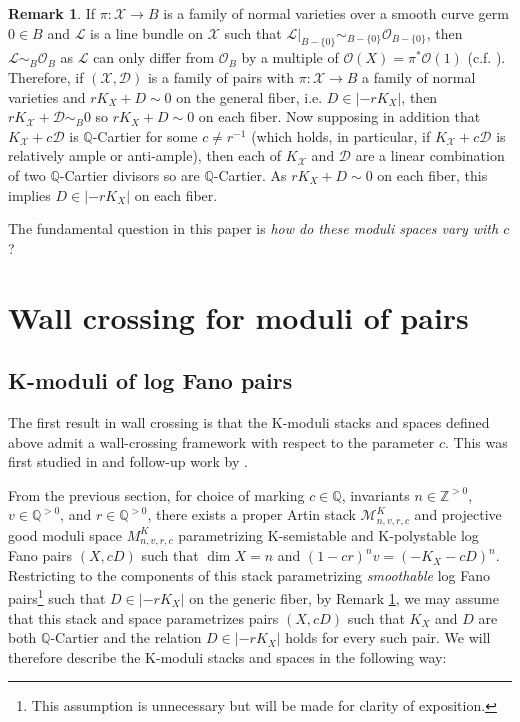 \documentclass[11pt]{amsart}
\numberwithin{equation}{section}
\theoremstyle{definition}
\newtheorem{remark}[theorem]{Remark}
\newcommand{\bQ}{\mathbb{Q}}
\newcommand{\calL}{\mathcal{L}}
\newcommand{\calX}{\mathcal{X}}
\newcommand{\calD}{\mathcal{D}}
\newcommand{\calO}{\mathcal{O}}
\newcommand{\calM}{\mathcal{M}}
\newcommand{\bZ}{\mathbb{Z}}
\begin{document}
\begin{remark}\label{rmk:fiberwiseDinKX}
    If $\pi: \calX \to B$ is a family of normal varieties over a smooth curve germ $0 \in B$ and $\calL$ is a line bundle on $\calX$ such that $\calL|_{B-\{0\}} \sim_{B - \{0\}} \calO_{B - \{ 0\}}$, then $\calL \sim_B \calO_B$ as $\calL$ can only differ from $\calO_B$ by a multiple of $\calO(X) = \pi^*\calO(1)$ (c.f. \cite[Proposition 6.5]{hartshorne}).  Therefore, if $(\calX, \calD)$ is a family of pairs with $\pi: \calX \to B$ a family of normal varieties and $rK_X + D \sim 0$ on the general fiber, i.e. $D \in |-rK_X|$, then $rK_{\calX} + \calD \sim_B 0$ so $rK_X + D \sim 0$ on each fiber.  Now supposing in addition that $K_{\calX} + c\calD$ is $\bQ$-Cartier for some $c \ne r^{-1}$ (which holds, in particular, if $K_{\calX} + c\calD$ is relatively ample or anti-ample), then each of $K_{\calX}$ and $\calD$ are a linear combination of two $\bQ$-Cartier divisors so are $\bQ$-Cartier.  As $rK_X + D \sim 0$ on each fiber, this implies $D \in |-rK_X|$ on each fiber. 
\end{remark}

The fundamental question in this paper is \textit{how do these moduli spaces vary with $c$}?


\section{Wall crossing for moduli of pairs}\label{sec:wallcrossing}

\subsection{K-moduli of log Fano pairs}

The first result in wall crossing is that the K-moduli stacks and spaces defined above admit a wall-crossing framework with respect to the parameter $c$. This was first studied in \cite{ADLpub} and follow-up work by \cite{Zhou}.

From the previous section, for choice of marking $c \in \bQ$, invariants $n \in\bZ^{> 0}$, $v \in \bQ^{>0}$, and $r \in \bQ^{>0}$, there exists a proper Artin stack $\calM^K_{n,v,r,c}$ and projective good moduli space $M^K_{n,v,r,c}$ parametrizing K-semistable and K-polystable log Fano pairs $(X,cD)$ such that $\dim X = n$ and $(1-cr)^nv = (-K_X - cD)^n$.  Restricting to the components of this stack parametrizing \textit{smoothable} log Fano pairs\footnote{This assumption is unnecessary but will be made for clarity of exposition.} such that $D \in |-rK_X|$ on the generic fiber, by Remark \ref{rmk:fiberwiseDinKX}, we may assume that this stack and space parametrizes pairs $(X,cD)$ such that $K_X$ and $D$ are both $\bQ$-Cartier and the relation $D \in |-rK_X|$ holds for every such pair.  We will therefore describe the K-moduli stacks and spaces in the following way: 
\end{document}
